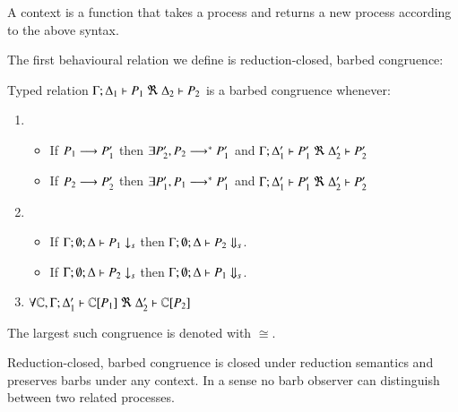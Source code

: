 A context is a function that takes a process and returns a new process
according to the above syntax.

The first behavioural relation we define is reduction-closed, barbed congruence:
%
\begin{definition}\rm
	Typed relation
	$\horel{\Gamma}{\Delta_1}{P_1}{\ \Re\ }{\Delta_2}{P_2}$
	is a barbed congruence whenever:
%
	\begin{enumerate}
		\item
		\begin{itemize}
			\item	If $P_1 \longrightarrow P_1'$ then $\exists P_2', P_2 \longrightarrow^* P_1'$ and
				$\horel{\Gamma}{\Delta_1'}{P_1'}{\ \Re\ }{\Delta_2'}{P_2'}$
			\item	If $P_2 \longrightarrow P_2'$ then $\exists P_1', P_1 \longrightarrow^* P_1'$ and
				$\horel{\Gamma}{\Delta_1'}{P_1'}{\ \Re\ }{\Delta_2'}{P_2'}$
		\end{itemize}

		\item
		\begin{itemize}
			\item	If $\Gamma;\emptyset;\Delta \vdash P_1 \downarrow_{s}$ then $\Gamma;\emptyset;\Delta \vdash P_2 \Downarrow_{s}$.
			\item	If $\Gamma;\emptyset;\Delta \vdash P_2 \downarrow_{s}$ then $\Gamma;\emptyset;\Delta \vdash P_1 \Downarrow_{s}$.
		\end{itemize}

		\item	$\forall \C, \horel{\Gamma}{\Delta_1'}{\context{\C}{P_1}}{\ \Re\ }{\Delta_2'}{\context{\C}{P_2}}$
	\end{enumerate}
%
	The largest such congruence is denoted with $\cong$.
\end{definition}
%
Reduction-closed, barbed congruence is closed under reduction semantics and 
preserves barbs under any context. In a sense no barb observer can distinguish
between two related processes.

